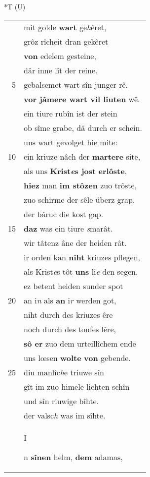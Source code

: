 \documentclass[8pt,a4paper,notitlepage]{article}
\begin{document}
\begin{table}[ht]
\begin{minipage}[t]{0.5\linewidth}
\small
\begin{center}*T (U)
\end{center}
\begin{tabular}{rl}
 & mit golde \textbf{wart} ge\textit{h}êret,\\ 
 & grôz rîcheit dran gekêret\\ 
 & \textbf{von} edelem gesteine,\\ 
 & dâr inne lît der reine.\\ 
5 & gebalsemet wart sîn junger rê.\\ 
 & \textbf{vor jâmere wart vil liuten} wê.\\ 
 & ein tiure rubîn ist der stein\\ 
 & ob sîme grabe, dâ durch er schein.\\ 
 & uns wart gevolget hie mite:\\ 
10 & ein kriuze nâch der \textbf{martere} site,\\ 
 & als uns \textbf{Krist\textit{e}s jost} \textbf{erlôste},\\ 
 & \textbf{hiez} man \textbf{im stôzen} zuo trôste,\\ 
 & zuo schirme der sêle überz grap.\\ 
 & der bâruc die kost gap.\\ 
15 & \textbf{daz} was ein tiure \textit{s}marât.\\ 
 & wir tâtenz âne der heiden rât.\\ 
 & ir orden kan \textbf{niht} kriuzes pflegen,\\ 
 & als Krist\textit{e}s tôt \textbf{uns} li\textit{e} den segen.\\ 
 & ez betent heiden sunder spot\\ 
20 & an i\textit{n} als \textbf{an} i\textit{r} werden got,\\ 
 & niht durch des kriuzes êre\\ 
 & noch durch des toufes lêre,\\ 
 & \textbf{sô er} zuo dem urteillîchem ende\\ 
 & uns lœsen \textbf{wolte} \textbf{von} gebende.\\ 
25 & diu manlîc\textit{h}e triuwe sîn\\ 
 & gît im zuo himele liehten schîn\\ 
 & und sîn riuwige bîhte.\\ 
 & der valsc\textit{h} was im sîhte.\\ 
 & \begin{large}I\end{large}n \textbf{sînen} helm, \textbf{dem} adamas,\\ 

\end{tabular}
\end{minipage}
\end{table}
\end{document}

